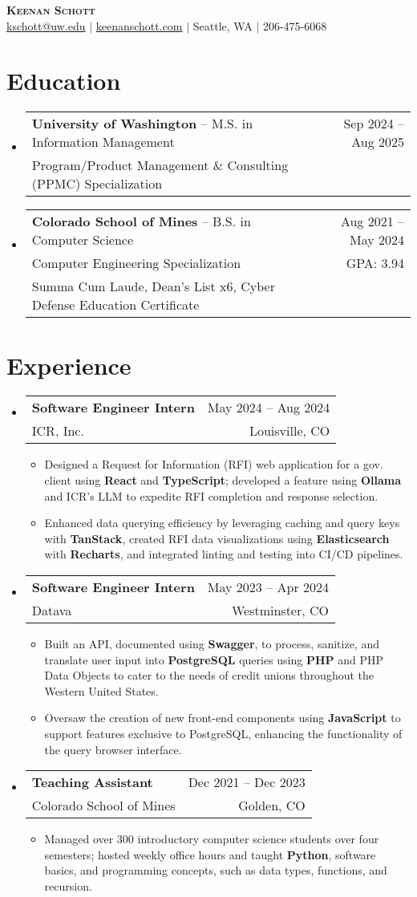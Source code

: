 \documentclass[letterpaper,11pt]{article}
\makeatletter
\newcommand{\resumeItem}[1]{
  \item\small{
    {#1 \vspace{-2pt}}
  }
}
\newcommand{\uwSubheading}[5]{
  \vspace{-2pt}\item
    \begin{tabular*}{0.97\textwidth}[t]{l@{\extracolsep{\fill}}r}
      \textbf{#1} -- {\small #2} & {\small #3} \\
      {\small #4} & {\small #5} \\
    \end{tabular*}\vspace{-7pt}
}
\newcommand{\minesSubheading}[6]{
  \vspace{-2pt}\item
    \begin{tabular*}{0.97\textwidth}[t]{l@{\extracolsep{\fill}}r}
      \textbf{#1} -- {\small #2} & {\small #3} \\
      {\small #4} & {\small #5} \\
      {\small #6}
    \end{tabular*}\vspace{-7pt}
}
\newcommand{\resumeSubheading}[4]{
  \vspace{-2pt}\item
    \begin{tabular*}{0.97\textwidth}[t]{l@{\extracolsep{\fill}}r}
      \textbf{#1} & {\small #2} \\
      {\small #3} & {\small #4} \\
    \end{tabular*}\vspace{-7pt}
}
\newcommand{\resumeSubHeadingListStart}{\begin{itemize}[leftmargin=0.15in, label={}]}
\newcommand{\resumeSubHeadingListEnd}{\end{itemize}}
\newcommand{\resumeItemListStart}{\begin{itemize}}
\newcommand{\resumeItemListEnd}{\end{itemize}\vspace{-5pt}}
\makeatother
\begin{document}
\begin{center}
    \textbf{\huge \scshape Keenan Schott} \\ \vspace{1pt}
    \href{mailto:kschott@uw.edu}{{kschott@uw.edu}} $|$  
    \href{https://keenanschott.com/portfolio/}{{keenanschott.com}} $|$
    \small Seattle, WA $|$
    \small 206-475-6068 
\end{center}

\section{Education}
  \resumeSubHeadingListStart
      \uwSubheading
      {University of Washington}{M.S. in Information Management}{Sep 2024 -- Aug 2025}
      {Program/Product Management \& Consulting (PPMC) Specialization}{}
      \minesSubheading
      {Colorado School of Mines}{B.S. in Computer Science}{Aug 2021 -- May 2024}
      {Computer Engineering Specialization}{GPA: 3.94}
      {Summa Cum Laude, Dean's List x6, Cyber Defense Education Certificate}
  \resumeSubHeadingListEnd

\section{Experience}
  \resumeSubHeadingListStart
    \resumeSubheading
      {Software Engineer Intern}{May 2024 -- Aug 2024}
      {ICR, Inc.}{Louisville, CO}
      \resumeItemListStart
        \resumeItem
        {Designed a Request for Information (RFI) web application for a gov. client using \textbf{React} and \textbf{TypeScript}; developed a feature using \textbf{Ollama} and ICR's LLM to expedite RFI completion and response selection.}
        \resumeItem
        {Enhanced data querying efficiency by leveraging caching and query keys with \textbf{TanStack}, created RFI data visualizations using \textbf{Elasticsearch} with \textbf{Recharts}, and integrated linting and testing into CI/CD pipelines.}
      \resumeItemListEnd
    \resumeSubheading
      {Software Engineer Intern}{May 2023 -- Apr 2024}
      {Datava}{Westminster, CO}
      \resumeItemListStart
        \resumeItem
        {Built an API, documented using \textbf{Swagger}, to process, sanitize, and translate user input into \textbf{PostgreSQL} queries using \textbf{PHP} and PHP Data Objects to cater to the needs of credit unions throughout the Western United States.}
        \resumeItem
        {Oversaw the creation of new front-end components using \textbf{JavaScript} to support features exclusive to PostgreSQL, enhancing the functionality of the query browser interface.}
      \resumeItemListEnd
    \resumeSubheading
      {Teaching Assistant}{Dec 2021 -- Dec 2023}
      {Colorado School of Mines}{Golden, CO}
      \resumeItemListStart
        \resumeItem
        {Managed over 300 introductory computer science students over four semesters; hosted weekly office hours and taught \textbf{Python}, software basics, and programming concepts, such as data types, functions, and recursion.}
      \resumeItemListEnd
  \resumeSubHeadingListEnd
\end{document}
